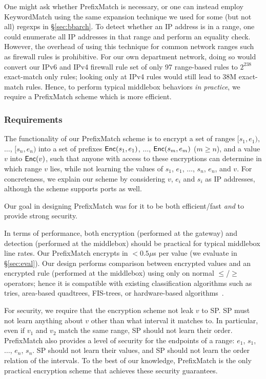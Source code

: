 One might ask whether PrefixMatch is necessary, or one can instead employ KeywordMatch using the same expansion technique we used for some (but not all) regexps in \S\ref{sec:bbarch}. 
To detect whether an IP address is in a range, one could enumerate all IP addresses in that range and perform an equality check. However, the overhead of using this technique for common network ranges such as firewall rules is prohibitive.
For our own department network, doing so would convert our IPv6 and IPv4 firewall rule set of only 97 range-based rules to $2^{238}$ exact-match only rules; looking only at IPv4 rules would still lead to 38M exact-match rules.
Hence, to perform typical middlebox behaviors {\it in practice}, we require a PrefixMatch scheme which is more efficient.

\subsubsection{Requirements}
The functionality of our PrefixMatch scheme is to encrypt a set of ranges $[s_1, e_1)$, $\dots$, $[s_n, e_n)$ into a set of prefixes $\mathsf{Enc}(s_1, e_1)$, $\dots$, $\mathsf{Enc}(s_m, e_m)$ ($m \geq n$), and a value $v$ into $\mathsf{Enc}(v)$, such that anyone with access to these encryptions can determine in which range $v$ lies, while not learning the values of $s_1$, $e_1$, $\dots$, $s_n$, $e_n$, and $v$. 
For concreteness, we explain our scheme by considering $v$, $e_i$ and $s_i$ as IP addresses, although the scheme supports ports as well.


Our goal in designing PrefixMatch was for it to be both efficient/fast {\em and} to provide strong security.

In terms of performance, both encryption (performed at the gateway) and detection (performed at the middlebox) should be practical for typical middlebox line rates.
Our PrefixMatch encrypts in $< 0.5\mu$s per value (we evaluate in \S\ref{sec:eval}).
Our design performs comparison between encrypted values and an encrypted rule (performed at the middlebox) using only on normal $\leq$/$\geq$ operators; hence it is compatible with existing classification algorithms such as tries, area-based quadtrees, FIS-trees, or hardware-based algorithms~\cite{packet_classif}.

For security, we require that the encryption scheme  not leak $v$ to SP.
SP must not learn anything about $v$ other than what interval it matches to. 
In  particular, even if $v_1$ and $v_2$ match the same range, SP should not learn their order.
PrefixMatch also provides a level of security for the endpoints of a range:
 $e_1$, $s_1$, $\dots$, $e_n$, $s_n$. SP should not learn their values, and SP should not learn the order relation of the intervals. 
To the best of our knowledge, PrefixMatch is the only practical encryption scheme that achieves these security guarantees.

